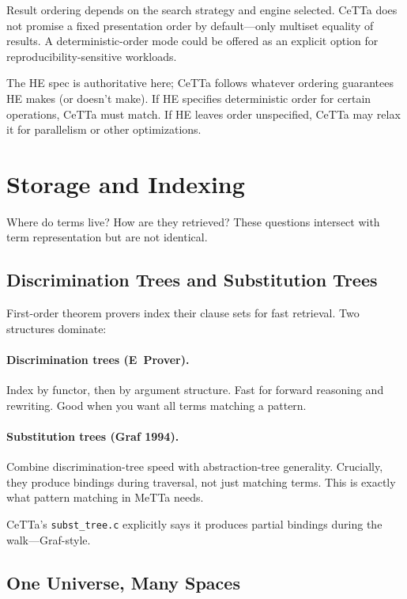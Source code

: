 \documentclass[11pt]{article}
\newcommand{\code}[1]{\texttt{#1}}
\newcommand{\HE}{\textup{HE}}
\newcommand{\CeTTa}{\textup{CeTTa}}
\begin{document}
Result ordering depends on the search strategy and engine selected.
\CeTTa{} does not promise a fixed presentation order by default---only
multiset equality of results.  A deterministic-order mode could be offered
as an explicit option for reproducibility-sensitive workloads.

The \HE{} spec is authoritative here; \CeTTa{} follows whatever ordering
guarantees \HE{} makes (or doesn't make).  If \HE{} specifies deterministic
order for certain operations, \CeTTa{} must match.  If \HE{} leaves order
unspecified, \CeTTa{} may relax it for parallelism or other optimizations.

\section{Storage and Indexing}
\label{sec:storage}

Where do terms live?  How are they retrieved?  These questions intersect
with term representation but are not identical.

\subsection{Discrimination Trees and Substitution Trees}

First-order theorem provers index their clause sets for fast retrieval.
Two structures dominate:

\paragraph{Discrimination trees (E~Prover).}
Index by functor, then by argument structure.  Fast for forward reasoning
and rewriting.  Good when you want all terms matching a pattern.

\paragraph{Substitution trees (Graf 1994).}
Combine discrimination-tree speed with abstraction-tree generality.
Crucially, they produce bindings during traversal, not just matching terms.
This is exactly what pattern matching in MeTTa needs.

\CeTTa{}'s \code{subst\_tree.c} explicitly says it produces partial
bindings during the walk---Graf-style.

\subsection{One Universe, Many Spaces}
\end{document}
